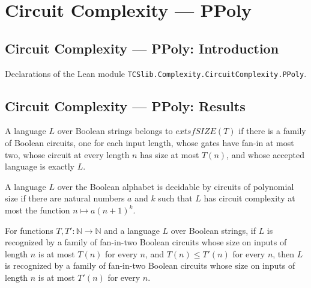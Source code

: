\section{Circuit Complexity --- PPoly}
\subsection*{Circuit Complexity --- PPoly: Introduction}

Declarations of the Lean module \texttt{TCSlib.Complexity.CircuitComplexity.PPoly}.

\subsection*{Circuit Complexity --- PPoly: Results}

\begin{definition}
\label{Language.InSIZE}
\leanok
{}
A language $L$ over Boolean strings belongs to $	extsf{SIZE}(T)$ if there is a family of
Boolean circuits, one for each input length, whose gates have fan-in at most two, whose
circuit at every length $n$ has size at most $T(n)$, and whose accepted language is
exactly $L$.
\end{definition}

\begin{definition}
\label{Language.InPPoly}
\leanok
{}
A language $L$ over the Boolean alphabet is decidable by circuits of polynomial size if
there are natural numbers $a$ and $k$ such that $L$ has circuit complexity at most the
function $n\mapsto a(n+1)^k$.
\end{definition}

\begin{theorem}
\label{Language.InSIZE.mono}
\leanok
{}
For functions $T,T' : \mathbb{N} \to \mathbb{N}$ and a language $L$ over Boolean
strings, if $L$ is recognized by a family of fan-in-two Boolean circuits whose size on
inputs of length $n$ is at most $T(n)$ for every $n$, and $T(n) \leq T'(n)$ for every
$n$, then $L$ is recognized by a family of fan-in-two Boolean circuits whose size on
inputs of length $n$ is at most $T'(n)$ for every $n$.
\end{theorem}

